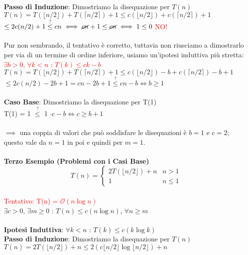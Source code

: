 \documentclass[../cheatSheetAlgoritmi.tex]{subfiles}
\begin{document}
\textbf{Passo di Induzione}: Dimostriamo la disequazione per $T(n)$\\
$T(n) =  T(\lfloor n/2 \rfloor) + T(\lceil n/2 \rceil) + 1 \leq c(\lfloor n/2 \rfloor) + c(\lceil n/2 \rceil) + 1$\\
$\leq 2c(n/2) + 1 \stackrel{?}{\leq} cn \iff \cancel{cn} + 1 \leq \cancel{cn} \iff 1 \leq 0$ \textcolor{red}{NO!}\\\\
Pur non sembrando, il tentativo è corretto, tuttavia non riusciamo a dimostrarlo per via di un termine di ordine inferiore, usiamo un'ipotesi induttiva più stretta:\\
\textcolor{red}{$\exists b > 0$, $\forall k < n$ : $T(k) \leq ck - b$}\\
$T(n) =  T(\lfloor n/2 \rfloor) + T(\lceil n/2 \rceil) + 1 \leq c(\lfloor n/2 \rfloor) - b + c(\lceil n/2 \rceil) - b + 1$\\
$\leq 2c(n/2) - 2b + 1 = cn - 2b + 1 \stackrel{?}{\leq} cn - b \iff b \geq 1$\\\\
\textbf{Caso Base}: Dimostriamo la disequazione per T(1)\\
T(1) = 1 $\stackrel{?}{\leq}$ 1 $\cdot c - b \iff c \geq b + 1$\\\\
$\implies$ una coppia di valori che può soddisfare le disequazioni è $b = 1$ e $c = 2$; questo vale da $n = 1$ in poi e quindi per $m = 1$.\\\\
\textbf{Terzo Esempio (Problemi con i Casi Base)}
	\begin{equation*}
  		T(n)=\begin{cases}
    		2T(\lfloor n/2 \rfloor) + n & \text{$n > 1$}\\
    		1 & \text{$n \leq 1$}
  		\end{cases}
	\end{equation*}
\hfill\\
\textcolor{red}{Tentativo: T(n) = $\mathcal{O}(n\log{n})$}\\
$\exists c > 0$, $\exists m \geq 0$ : $T(n) \leq c(n\log{n})$, $\forall n \geq m$\\\\
\textbf{Ipotesi Induttiva}: $\forall k < n$ : $T(k) \leq c(k\log{k})$\\
\textbf{Passo di Induzione}: Dimostriamo la disequazione per $T(n)$\\
$T(n) = 2T(\lfloor n/2 \rfloor) + n \leq 2(c \lfloor n/2 \rfloor \log{\lfloor n/2 \rfloor}) + n$\\
\end{document}
